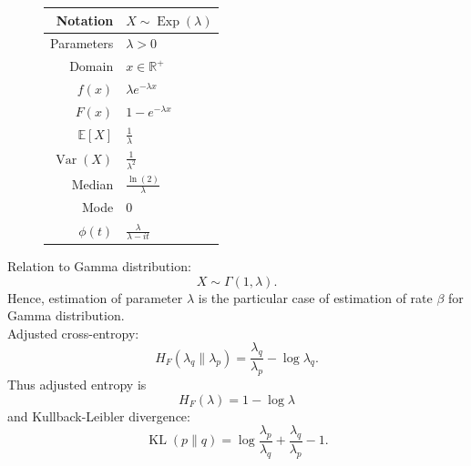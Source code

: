 \documentclass[a4paper,11pt]{article}
\theoremstyle{plain}
\theoremstyle{definition}
\newcommand{\ME}{\mathbb{E}}
\newcommand{\MR}{\mathbb{R}}
\newcommand{\Var}{\operatorname{Var}}
\begin{document}
\begin{figure}[!htb]
\begin{minipage}{0.4\textwidth}
\begin{tabular}{| r | l |}
			\hline
			Notation & $X \sim \operatorname{Exp}(\lambda)$ \\
			\hline
			Parameters & $\lambda > 0$ \\
			\hline
			Domain & $x \in \MR^+$  \\
			\hline
			$f(x)$ & $\lambda e^{-\lambda x}  $ \\
			\hline
			$F(x)$ & $1-e^{-\lambda x} $\\
			\hline
			$\ME[X]$ & $ \frac{1}{\lambda}$ \\
			\hline
			$\Var(X)$ & $\frac{1}{\lambda^2}$ \\
			\hline
			Median & $\frac{\ln(2)}{\lambda}$ \\
			\hline
			Mode & $0$ \\
			\hline
			$\phi(t)$ & $ \frac{\lambda}{\lambda-it}$ \\
			\hline
		\end{tabular}
		\end{minipage}
	\end{figure}

	Relation to Gamma distribution:
	\[X \sim \Gamma(1, \lambda).\]
	Hence, estimation of parameter $\lambda$ is the particular case of estimation of rate $\beta$ for Gamma distribution. \\
	Adjusted cross-entropy:
	\[
	H_F(\lambda_q \| \lambda_p) = \frac{\lambda_q}{\lambda_p}-\log \lambda_q. 
	\]
	Thus adjusted entropy is
	\[
	H_F(\lambda) = 1 - \log \lambda
	\]
	and Kullback-Leibler divergence:
	\[
	\operatorname{KL}(p \| q) = \log \frac{\lambda_p}{\lambda_q} + \frac{\lambda_q}{\lambda_p} - 1.
	\]
	
	\pagebreak
\end{document}
